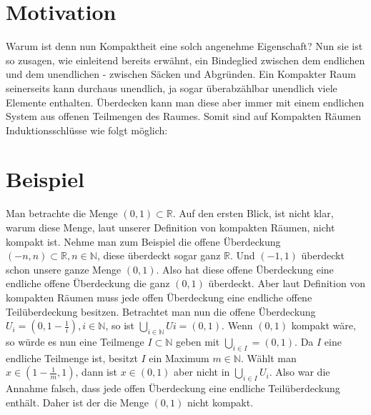 \section{Motivation}
Warum ist denn nun Kompaktheit eine solch angenehme Eigenschaft? Nun sie ist so zusagen, wie einleitend bereits erwähnt, 
ein Bindeglied zwischen dem endlichen und dem unendlichen - zwischen Säcken und Abgründen. Ein Kompakter Raum seinerseits 
kann durchaus unendlich, ja sogar überabzählbar unendlich viele Elemente enthalten. Überdecken kann man diese aber immer mit
einem endlichen System aus offenen Teilmengen des Raumes. Somit sind auf Kompakten Räumen Induktionsschlüsse wie folgt möglich:

\section{Beispiel}
Man betrachte die Menge \( (0,1) \subset \mathbb{R} \). Auf den ersten Blick, ist nicht klar, warum diese Menge, laut unserer Definition von kompakten Räumen, nicht kompakt ist. 
Nehme man zum Beispiel die offene Überdeckung \( (-n,n) \subset \mathbb{R} , n \in \mathbb{N} \), diese überdeckt sogar ganz \(  \mathbb{R} \). 
Und \( (-1,1)  \) überdeckt schon unsere ganze Menge \( (0,1)  \). Also hat diese offene Überdeckung eine endliche offene Überdeckung die ganz \( (0,1)  \) überdeckt.
Aber laut Definition von kompakten Räumen muss jede offen Überdeckung eine endliche offene Teilüberdeckung besitzen. Betrachtet man nun die offene Überdeckung 
\( U_{i}=(0,1-\frac{1}{i}), i \in \mathbb{N} \), so ist \(\bigcup_{i \in \mathbb{N}} U{i} = (0,1) \). Wenn \( (0,1)  \) kompakt wäre, 
so würde es nun eine Teilmenge \(I \subset \mathbb{N} \) geben mit \(\bigcup_{i \in I} = (0,1) \).
Da \(I\) eine endliche Teilmenge ist, besitzt \(I\) ein Maximum \( m \in \mathbb{N} \). Wählt man \(x \in (1-\frac{1}{m},1) \), dann ist \(x \in (0,1) \) aber nicht in \(\bigcup_{i \in I} U_{i}\). Also war die Annahme falsch, dass jede offen Überdeckung eine endliche Teilüberdeckung enthält. Daher ist der die Menge \((0,1) \) nicht kompakt.
		
